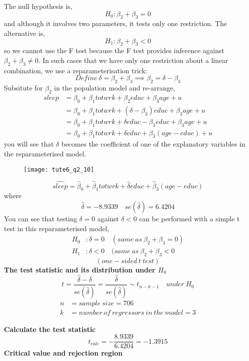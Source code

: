 \documentclass[12pt]{report}
\begin{document}
\noindent The null hypothesis is,
$$H_0: \beta_2 + \beta_3 = 0$$ 
and although it involves two parameters, it tests only one restriction. The alternative is, 
$$H_1: \beta_2 + \beta_3 < 0$$ so we cannot use the F test because the F test provides inference against $\beta_2 + \beta_3 \neq 0$. In such cases that we have only one restriction about a linear combination, we use a reparameterisation trick: 
$$Define\ \delta = \beta_2 + \beta_3 \implies \beta_2 = \delta - \beta_3$$
Subsitute for $\beta_2$ in the population model and re-arrange, \begin{align*}
	sleep &= \beta_0 + \beta_1 totwrk + \beta_2 educ + \beta_3 age + u \\
	&= \beta_0 + \beta_1 totwrk + (\delta - \beta_3) educ + \beta_3 age + u \\
	&= \beta_0 + \beta_1 totwrk + \delta educ - \beta_3 educ + \beta_3 age + u \\
	&= \beta_0 + \beta_1 totwrk + \delta educ + \beta_3 (age - educ) + u 
\end{align*} you will see that $\delta$ becomes the coefficient of one of the explanatory variables in the reparameterised model. \begin{figure}[H]
	\centerline{\texttt{[image: tute6\_q2\_10]}}
\end{figure}
\vspace{-\baselineskip} $$\widehat{sleep} = \hat{\beta}_0 + \hat{\beta}_1 totwrk + \hat{\delta} educ + \hat{\beta}_3 (age - educ)$$ where $$\hat{\delta} = -8.9339 \quad se(\hat{\delta}) = 6.4204$$
\noindent You can see that testing $\delta = 0$ against $\delta < 0$ can be performed with a simple t test in this reparameterised model,
\begin{align*}
	H_0&: \delta = 0 \quad (same\ as\ \beta_2 + \beta_3 = 0) \\
	H_1&: \delta < 0 \quad (same\ as\ \beta_2 + \beta_3 < 0
\end{align*}
$$(one-sided\ t\ test)$$
\noindent \textbf{The test statistic and its distribution under $H_0$}
$$t = \dfrac{\hat{\delta} - \delta}{se(\hat{\delta})} = \dfrac{\hat{\delta}}{se(\hat{\delta})} \sim t_{n-k-1} \quad under\ H_0$$
\begin{align*}
n &= sample\ size = 706 \\
k &= number\ of\ regressors\ in\ the\ model = 3
\end{align*}

\noindent \textbf{Calculate the test statistic}
$$t_{calc} = -\dfrac{8.9339}{6.4204} = -1.3915$$
\noindent \textbf{Critical value and rejection region}
\end{document}
